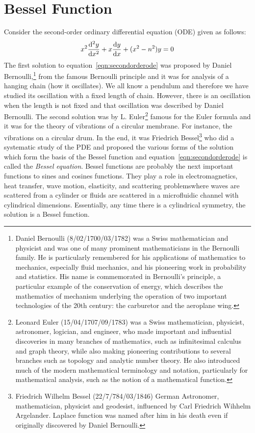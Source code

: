 \section{Bessel Function}
Consider the second-order ordinary differential equation (ODE) given as follows:
\begin{align}
x^2 \derivative[2]{y}{x} + x \derivative{y}{x} + (x^2 - n^2)y = 0
\label{eqn:secondorderode}
\end{align}
The first solution to equation~\eqref{eqn:secondorderode} was proposed by Daniel Bernoulli,\footnote{
Daniel Bernoulli (8/02/1700/03/1782) was a Swiss mathematician and physicist and was one of many prominent mathematicians in the Bernoulli family. He is particularly remembered for his applications of mathematics to mechanics, especially fluid mechanics, and his pioneering work in probability and statistics. His name is commemorated in Bernoulli's principle, a particular example of the conservation of energy, which describes the mathematics of mechanism underlying the operation of two important technologies of the 20th century: the carburetor and the aeroplane wing.
}
from the famous Bernoulli principle and it was for analysis of a hanging chain (how it oscillates). We all know a pendulum and therefore we have studied its oscillation with a fixed length of chain. However, there is an oscillation when the length is not fixed and that oscillation was described by Daniel Bernoulli. The second solution was by L. Euler\footnote{
Leonard Euler (15/04/1707/09/1783) was a Swiss mathematician, physicist, astronomer, logician, and engineer, who made important and influential discoveries in many branches of mathematics, such as infinitesimal calculus and graph theory, while also making pioneering contributions to several branches such as topology and analytic number theory. He also introduced much of the modern mathematical terminology and notation, particularly for mathematical analysis, such as the notion of a mathematical function.
} famous for the Euler formula and it was for the theory of vibrations of a circular membrane. For instance, the vibrations on a circular drum. In the end, it was Friedrich Bessel\footnote{
Friedrich Wilhelm Bessel (22/7/784/03/1846) German Astronomer, mathematician, physicist and geodesist, influenced by Carl Friedrich Wihhelm Argelander. Laplace function was named after him in his death even if originally discovered by Daniel Bernoulli.
} who did a systematic study of the PDE and proposed the various forms of the solution which form the basis of the Bessel function and equation~\eqref{eqn:secondorderode} is called the \emph{Bessel equation}. Bessel functions are probably the next important functions to sines and cosines functions. They play a role in electromagnetics, heat transfer, wave motion, elasticity, and scattering problems\textemdash where waves are scattered from a cylinder or fluids are scattered in a microfluidic channel with cylindrical dimensions. Essentially, any time there is a cylindrical symmetry, the solution is a Bessel function.

